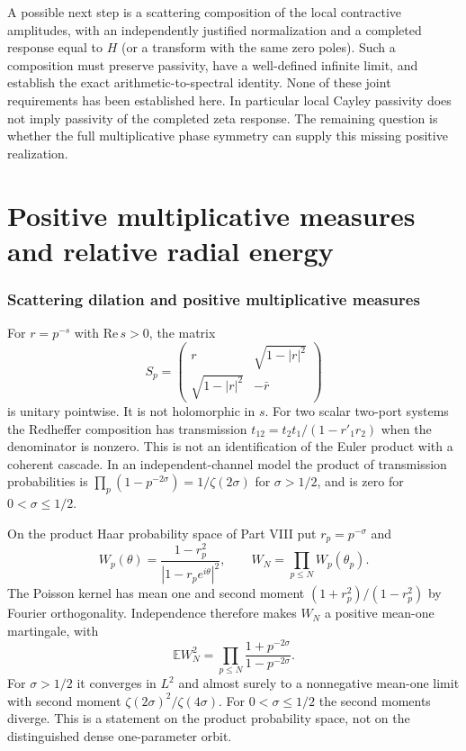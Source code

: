 \documentclass[11pt,a4paper]{article}
\theoremstyle{definition}\newtheorem{definition}[proposition]{Definition}
\theoremstyle{remark}\newtheorem{remark}[proposition]{Remark}
\begin{document}
A possible next step is a scattering composition of the local contractive amplitudes, with an independently justified normalization and a completed response equal to $H$ (or a transform with the same zero poles). Such a composition must preserve passivity, have a well-defined infinite limit, and establish the exact arithmetic-to-spectral identity. None of these joint requirements has been established here. In particular local Cayley passivity does not imply passivity of the completed zeta response. The remaining question is whether the full multiplicative phase symmetry can supply this missing positive realization.

\part{Positive multiplicative measures and relative radial energy}

\section{Scattering dilation and positive multiplicative measures}
For $r=p^{-s}$ with $\mathrm{Re}\,s>0$, the matrix
\[
S_p=\begin{pmatrix}r&\sqrt{1-|r|^2}\\
\sqrt{1-|r|^2}&-\bar r\end{pmatrix}
\]
is unitary pointwise. It is not holomorphic in $s$. For two scalar two-port systems the Redheffer composition has transmission $t_{12}=t_2t_1/(1-r'_1r_2)$ when the denominator is nonzero. This is not an identification of the Euler product with a coherent cascade. In an independent-channel model the product of transmission probabilities is $\prod_p(1-p^{-2\sigma})=1/\zeta(2\sigma)$ for $\sigma>1/2$, and is zero for $0<\sigma\le1/2$.

On the product Haar probability space of Part VIII put $r_p=p^{-\sigma}$ and
\[
W_p(\theta)=\frac{1-r_p^2}{|1-r_pe^{i\theta}|^2},\qquad
W_N=\prod_{p\le N}W_p(\theta_p).
\]
The Poisson kernel has mean one and second moment $(1+r_p^2)/(1-r_p^2)$ by Fourier orthogonality. Independence therefore makes $W_N$ a positive mean-one martingale, with
\[
\mathbb E W_N^2=\prod_{p\le N}\frac{1+p^{-2\sigma}}{1-p^{-2\sigma}}.
\]
For $\sigma>1/2$ it converges in $L^2$ and almost surely to a nonnegative mean-one limit with second moment $\zeta(2\sigma)^2/\zeta(4\sigma)$. For $0<\sigma\le1/2$ the second moments diverge. This is a statement on the product probability space, not on the distinguished dense one-parameter orbit.
\end{document}
